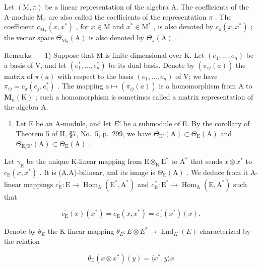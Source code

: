 Let \((\mathrm{M},\pi)\) be a linear representation of the algebra A. The coefficients of the A-module \(\mathrm{M}_{\pi}\) are also called the coefficients of the representation \(\pi\) . The coefficient \(c_{\mathrm{M}_{\pi}}(x,x^{*})\) , for \(x\in \mathrm{M}\) and \(x^{*}\in \mathrm{M}^{*}\) , is also denoted by \(c_{\pi}(x,x^{*})\) ; the vector space \(\Theta_{\mathrm{M}_{\pi}}(\mathrm{A})\) is also denoted by \(\Theta_{\pi}(\mathrm{A})\) .

Remarks. --- 1) Suppose that M is finite-dimensional over K. Let \((e_1, \ldots, e_n)\) be a basis of V, and let \((e_1^*, \ldots, e_n^*)\) be its dual basis. Denote by \((\pi_{ij}(a))\) the matrix of \(\pi(a)\) with respect to the basis \((e_1, \ldots, e_n)\) of V; we have \(\pi_{ij} = c_\pi(e_j, e_i^*)\) . The mapping \(a \mapsto (\pi_{ij}(a))\) is a homomorphism from A to \(\mathbf{M}_n(\mathrm{K})\) ; such a homomorphism is sometimes called a matrix representation of the algebra A.

\begin{enumerate}
\def\labelenumi{\arabic{enumi})}
\setcounter{enumi}{1}
\tightlist
\item
  Let E be an A-module, and let \(E'\) be a submodule of E. By the corollary of Theorem 5 of II, §7, No.~5, p.~299, we have \(\Theta_{\mathrm{E}'}(\mathrm{A}) \subset \Theta_{\mathrm{E}}(\mathrm{A})\) and \(\Theta_{\mathrm{E}/\mathrm{E}'}(\mathrm{A}) \subset \Theta_{\mathrm{E}}(\mathrm{A})\) .
\end{enumerate}

Let \(\gamma_{\mathrm{E}}\) be the unique K-linear mapping from \(\mathrm{E} \otimes_{\mathrm{K}} \mathrm{E}^{*}\) to \(\mathrm{A}^{*}\) that sends \(x \otimes x^{*}\) to \(c_{\mathrm{E}}(x, x^{*})\) . It is (A,A)-bilinear, and its image is \(\Theta_{\mathrm{E}}(\mathrm{A})\) . We deduce from it A-linear mappings \(c_{\mathrm{E}}^{\prime}: \mathrm{E} \to \operatorname{Hom}_{\mathrm{A}}(\mathrm{E}^{*}, \mathrm{A}^{*})\) and \(c_{\mathrm{E}}^{\prime \prime}: \mathrm{E}^{*} \to \operatorname{Hom}_{\mathrm{A}}(\mathrm{E}, \mathrm{A}^{*})\) such that

\[
c _ {\mathrm{E}} ^ {\prime} (x) (x ^ {*}) = c _ {\mathrm{E}} (x, x ^ {*}) = c _ {\mathrm{E}} ^ {\prime \prime} (x ^ {*}) (x).
\]

Denote by \(\theta_{E}\) the K-linear mapping \(\theta_{E}: E \otimes E^{*} \to \operatorname{End}_{K}(E)\) characterized by the relation

\[
\theta_ {\mathrm{E}} (x \otimes x ^ {*}) (y) = \langle x ^ {*}, y \rangle x
\]

